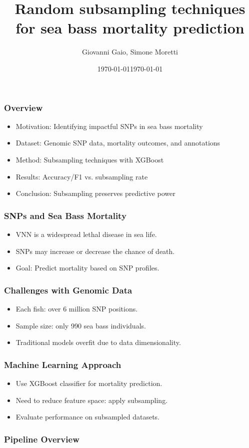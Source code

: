 \documentclass[aspectratio=169]{beamer}
\title{Random subsampling techniques for sea bass mortality prediction}
\author{Giovanni Gaio, Simone Moretti}
\date{\today}
\subtitle{}
\date{\today}
\begin{document}
\frame{\titlepage}

\begin{frame}
\frametitle{Overview}
\begin{itemize}
  \item Motivation: Identifying impactful SNPs in sea bass mortality
  \item Dataset: Genomic SNP data, mortality outcomes, and annotations
  \item Method: Subsampling techniques with XGBoost
  \item Results: Accuracy/F1 vs. subsampling rate
  \item Conclusion: Subsampling preserves predictive power
\end{itemize}
\end{frame}

\begin{frame}
\frametitle{SNPs and Sea Bass Mortality}
\begin{itemize}
  \item VNN is a widespread lethal disease in sea life.
  \item SNPs may increase or decrease the chance of death.
  \item Goal: Predict mortality based on SNP profiles.
\end{itemize}
\end{frame}

\begin{frame}
\frametitle{Challenges with Genomic Data}
\begin{itemize}
  \item Each fish: over 6 million SNP positions.
  \item Sample size: only 990 sea bass individuals.
  \item Traditional models overfit due to data dimensionality.
\end{itemize}
\end{frame}

\begin{frame}
\frametitle{Machine Learning Approach}
\begin{itemize}
  \item Use XGBoost classifier for mortality prediction.
  \item Need to reduce feature space: apply subsampling.
  \item Evaluate performance on subsampled datasets.
\end{itemize}
\end{frame}

\begin{frame}
\frametitle{Pipeline Overview}
\end{frame}
\end{document}
